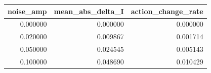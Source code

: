 \begin{tabular}{rrr}
\toprule
noise\_amp & mean\_abs\_delta\_I & action\_change\_rate \\
\midrule
0.000000 & 0.000000 & 0.000000 \\
0.020000 & 0.009867 & 0.001714 \\
0.050000 & 0.024545 & 0.005143 \\
0.100000 & 0.048690 & 0.010429 \\
\bottomrule
\end{tabular}
